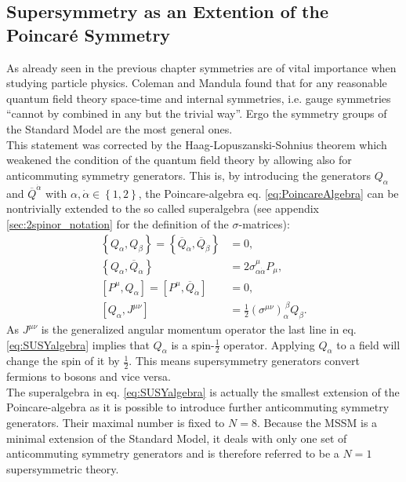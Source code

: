 \subsection{Supersymmetry as an Extention of the Poincaré Symmetry}\label{sec:SUSYalgebra}
As already seen in the previous chapter symmetries are of vital importance when studying particle physics. Coleman and Mandula \cite{Coleman:1967ad} found that for any reasonable quantum field theory space-time and internal symmetries, i.e. gauge symmetries ``cannot by combined in any but the trivial way''\cite{Pelc:1996vg}. Ergo the symmetry groups of the Standard Model are the most general ones.\\
This statement was corrected by the Haag-Lopuszanski-Sohnius theorem \cite{Haag:1974qh} which weakened the condition of the quantum field theory by allowing also for anticommuting symmetry generators. This is, by introducing the generators $Q_\alpha$ and $\overline{Q}^{\dot{\alpha}}$ with $\alpha, \dot{\alpha} \in \left\{ 1,2 \right\}$, the Poincare-algebra eq. \eqref{eq:PoincareAlgebra} can be nontrivially extended to the so called superalgebra (see appendix \eqref{sec:2spinor_notation} for the definition of the $\sigma$-matrices):
\begin{align}
\left\{Q_\alpha,Q_\beta\right\} = \left\{\overline{Q}_{\dot{\alpha}},\overline{Q}_{\dot{\beta}}\right\} &= 0,  \nonumber\\
\left\{Q_\alpha,\overline{Q}_{\dot{\alpha}}\right\} &= 2\sigma^\mu_{\alpha\dot{\alpha}} P_\mu, \nonumber\\
[P^\mu,Q_\alpha] = [P^\mu,\overline{Q}_{\dot{\alpha}}] &= 0, \nonumber \\
[Q_\alpha, J^{\mu\nu}] &= \frac{1}{2} (\sigma^{\mu\nu})_\alpha^{\ \beta} Q_\beta.\label{eq:SUSYalgebra}
\end{align}
As $J^{\mu\nu}$ is the generalized angular momentum operator the last line in eq. \eqref{eq:SUSYalgebra} implies that $Q_\alpha$ is a spin-$\frac{1}{2}$ operator. Applying $Q_\alpha$ to a field will change the spin of it by $\frac{1}{2}$. This means supersymmetry generators convert fermions to bosons and vice versa.\\
The superalgebra in eq. \eqref{eq:SUSYalgebra} is actually the smallest extension of the Poincare-algebra as it is possible to introduce further anticommuting symmetry generators. Their maximal number is fixed to $N = 8$. Because the MSSM is a minimal extension of the Standard Model, it deals with only one set of anticommuting symmetry generators and is therefore referred to be a $N = 1$ supersymmetric theory.\\
